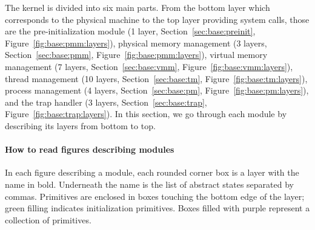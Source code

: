 The \mCTOSbase{} kernel is divided into six main parts.  From the
bottom layer which corresponds to the physical machine to the top
layer providing system calls, those are the pre-initialization module
(1 layer, Section~\ref{sec:base:preinit},
Figure~\ref{fig:base:pmm:layers}), physical memory management (3 layers,
Section~\ref{sec:base:pmm}, Figure~\ref{fig:base:pmm:layers}), virtual
memory management (7 layers, Section~\ref{sec:base:vmm},
Figure~\ref{fig:base:vmm:layers}), thread management (10 layers,
Section~\ref{sec:base:tm}, Figure~\ref{fig:base:tm:layers}), process
management (4 layers, Section~\ref{sec:base:pm},
Figure~\ref{fig:base:pm:layers}), and the trap handler (3 layers,
Section~\ref{sec:base:trap}, Figure~\ref{fig:base:trap:layers}).  In
this section, we go through each module by describing its
layers from bottom to top.  

\paragraph{How to read figures describing modules}
In each figure describing a module, each rounded corner box is a layer
with the name in bold. Underneath the name is the list of abstract
states separated by commas. Primitives are enclosed in boxes
touching the bottom edge of the layer; green filling indicates
initialization primitives. Boxes filled with purple represent
a collection of primitives.

